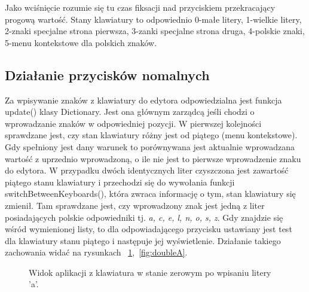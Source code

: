 \documentclass[twoside,a4paper]{book}
\begin{document}
Jako wciśnięcie rozumie się tu czas fiksacji nad przyciskiem przekracający progową wartość. Stany klawiatury to odpowiednio 0-małe litery, 1-wielkie litery, 2-znaki specjalne strona pierwsza, 3-zanki specjalne strona druga, 4-polskie znaki, 5-menu kontekstowe dla polskich znaków.
\subsection{Działanie przycisków nomalnych}
Za wpisywanie znaków z klawiatury do edytora odpowiedzialna jest funkcja \-update() klasy Dictionary. Jest ona głównym zarządcą jeśli chodzi o wprowadzanie znaków w odpowiedniej pozycji. W pierwszej kolejności sprawdzane jest, czy stan klawiatury różny jest od piątego (menu kontekstowe). Gdy spełniony jest dany warunek to porównywana jest aktualnie wprowadzana wartość z uprzednio wprowadzoną, o ile nie jest to pierwsze wprowadzenie znaku do edytora. W przypadku dwóch identycznych liter czyszczona jest zawartość piątego stanu klawiatury i przechodzi się do wywołania funkcji switchBetweenKeyboards(), która zwraca informację o tym, stan klawiatury się zmienił. Tam sprawdzane jest, czy wprowadzony znak jest jedną z liter posiadających polskie odpowiedniki tj. \textit{a, c, e, l, n, o, s, z}. Gdy znajdzie się wśród wymienionej listy, to dla odpowiadającego przycisku ustawiany jest test dla klawiatury stanu piątego i następuje jej wyświetlenie. Działanie takiego zachowania widać na rysunkach 
 ~\ref{fig:startA},~\ref{fig:doubleA}.
\begin{figure}[!h]
		\centering
		\caption{Widok aplikacji z klawiatura w stanie zerowym po wpisaniu litery 'a'.}
		\label{fig:startA}
\end{figure}
\end{document}
